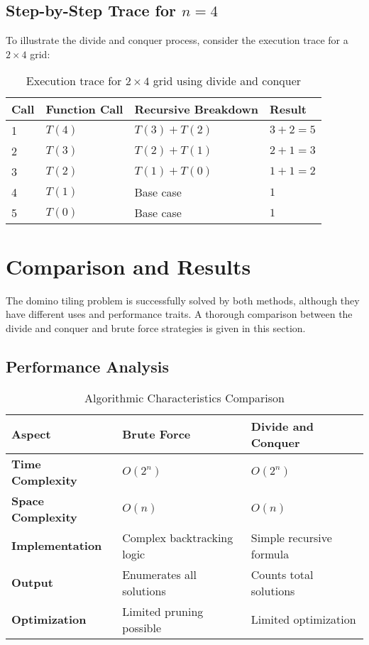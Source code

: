 \documentclass[conference]{IEEEtran}
\begin{document}
\subsection{Step-by-Step Trace for $n = 4$}

To illustrate the divide and conquer process, consider the execution trace for a $2 \times 4$ grid:

\begin{table}[htbp]
\centering
\caption{Execution trace for $2 \times 4$ grid using divide and conquer}
\label{tab:dc_trace}
\renewcommand{\arraystretch}{2}
\begin{tabular}{|p{1.5cm}|p{2.0cm}|p{2.0cm}|p{1.5cm}|}
\hline
\textbf{Call} & \textbf{Function Call} & \textbf{Recursive Breakdown} & \textbf{Result} \\
\hline
1 & $T(4)$ & $T(3) + T(2)$ & $3 + 2 = 5$ \\
\hline
2 & $T(3)$ & $T(2) + T(1)$ & $2 + 1 = 3$ \\
\hline
3 & $T(2)$ & $T(1) + T(0)$ & $1 + 1 = 2$ \\
\hline
4 & $T(1)$ & Base case & $1$ \\
\hline
5 & $T(0)$ & Base case & $1$ \\
\hline
\end{tabular}
\end{table}

\section{Comparison and Results}

The domino tiling problem is successfully solved by both methods, although they have different uses and performance traits. A thorough comparison between the divide and conquer and brute force strategies is given in this section.

\subsection{Performance Analysis}

\begin{table}[!htbp]
\centering
\caption{Algorithmic Characteristics Comparison}
\label{tab:algorithm_comparison}
\renewcommand{\arraystretch}{1.6}
\begin{tabular}{|p{2.2cm}|p{2cm}|p{2cm}|}
\hline
\textbf{Aspect} & \textbf{Brute Force} & \textbf{Divide and Conquer} \\
\hline
\textbf{Time Complexity} & $O(2^n)$ & $O(2^n)$ \\
\hline
\textbf{Space Complexity} & $O(n)$ & $O(n)$ \\
\hline
\textbf{Implementation} & Complex backtracking logic & Simple recursive formula \\
\hline
\textbf{Output} & Enumerates all solutions & Counts total solutions \\
\hline
\textbf{Optimization} & Limited pruning possible & Limited optimization \\
\hline
\end{tabular}
\end{table}
\end{document}
